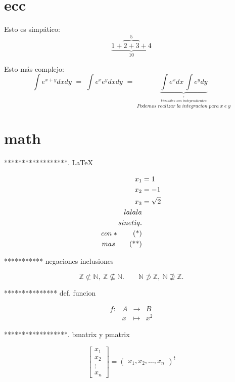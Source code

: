 \section{ecc}

Esto es simpático:
\[ \underbrace{1 + \overbrace{2 + 3}^{5} + 4}_{10} \]

Esto más complejo:
\begin{displaymath}
  \int e^{x+y}dx dy \,\, = \,\,
  \int e^x e^y dxdy \,\, = \,\,
  \underbrace{\int e^x dx \, \int e^y dy}_{\stackrel{\stackrel{\uparrow}{Variables \; son \;independientes}}{Podemos \;realizar\; la\; integracion\; para\; x\; e\; y}}
\end{displaymath}





\section{math}
******************. \LaTeX{}

\begin{align}
x_1 &= 1 \\
x_2 &= -1 \\
x_3 &= \sqrt{2} \\
lalala  \notag \\
sin etiq.  \notag \\
con *  \tag{*} \\
mas  \tag{**}
\end{align}

*********** negaciones inclusiones

$$\mathbb{Z} \not\subset \mathbb{N},\ \mathbb{Z} \not\subseteq \mathbb{N}.
\qquad 
\mathbb{N} \not\supset \mathbb{Z},\ \mathbb{N} \not\supseteq \mathbb{Z}. $$

*************** def. funcion

$$\begin{array}{rccl}
f: & A & \longrightarrow & B \\
& x & \mapsto & x^2
\end{array}$$



******************. bmatrix y pmatrix

$$\begin{bmatrix}
x_{1} \\
x_{2} \\
\vdots \\
x_{n}
\end{bmatrix}
=
\begin{pmatrix}
x_1, x_2, \dots, x_n
\end{pmatrix}^{t}$$

